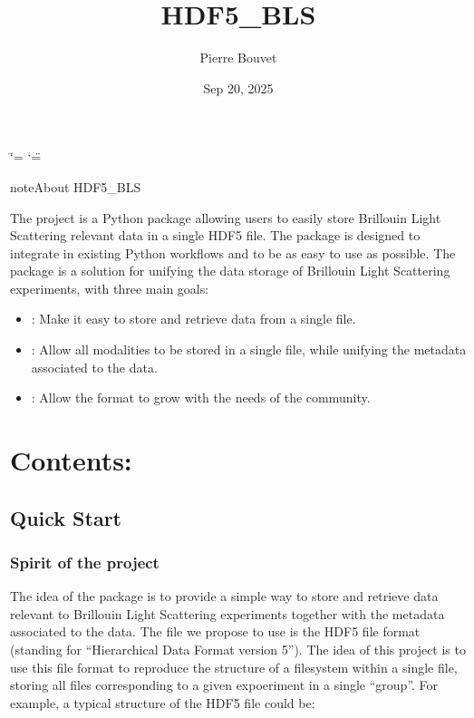 \documentclass[letterpaper,10pt,english]{sphinxmanual}
\title{HDF5\_BLS}
\date{Sep 20, 2025}
\author{Pierre Bouvet}
\begin{document}
\ifdefined\shorthandoff
  \ifnum\catcode`\=\string=\active\shorthandoff{=}\fi
  \ifnum\catcode`\"=\active{}\fi
\fi

\pagestyle{empty}
\sphinxmaketitle
\pagestyle{plain}
\sphinxtableofcontents
\pagestyle{normal}
\label{\detokenize{index::doc}}


\begin{sphinxadmonition}{note}{About HDF5\_BLS}

\sphinxAtStartPar
The  project is a Python package allowing users to easily store Brillouin Light Scattering relevant data in a single HDF5 file. The package is designed to integrate in existing Python workflows and to be as easy to use as possible. The package is a solution for unifying the data storage of Brillouin Light Scattering experiments, with three main goals:
\begin{itemize}
\item {} 
\sphinxAtStartPar
{}: Make it easy to store and retrieve data from a single file.

\item {} 
\sphinxAtStartPar
{}: Allow all modalities to be stored in a single file, while unifying the metadata associated to the data.

\item {} 
\sphinxAtStartPar
{}: Allow the format to grow with the needs of the community.

\end{itemize}
\end{sphinxadmonition}


\chapter{Contents:}
\label{\detokenize{index:contents}}
\sphinxstepscope


\section{Quick Start}
\label{\detokenize{source/quickstart:quick-start}}\label{\detokenize{source/quickstart::doc}}

\subsection{Spirit of the project}
\label{\detokenize{source/quickstart:spirit-of-the-project}}
\sphinxAtStartPar
The idea of the package is to provide a simple way to store and retrieve data relevant to Brillouin Light Scattering experiments together with the metadata associated to the data. The file we propose to use is the HDF5 file format (standing for “Hierarchical Data Format version 5”). The idea of this project is to use this file format to reproduce the structure of a filesystem within a single file, storing all files corresponding to a given expoeriment in a single “group”. For example, a typical structure of the HDF5 file could be:
\end{document}
